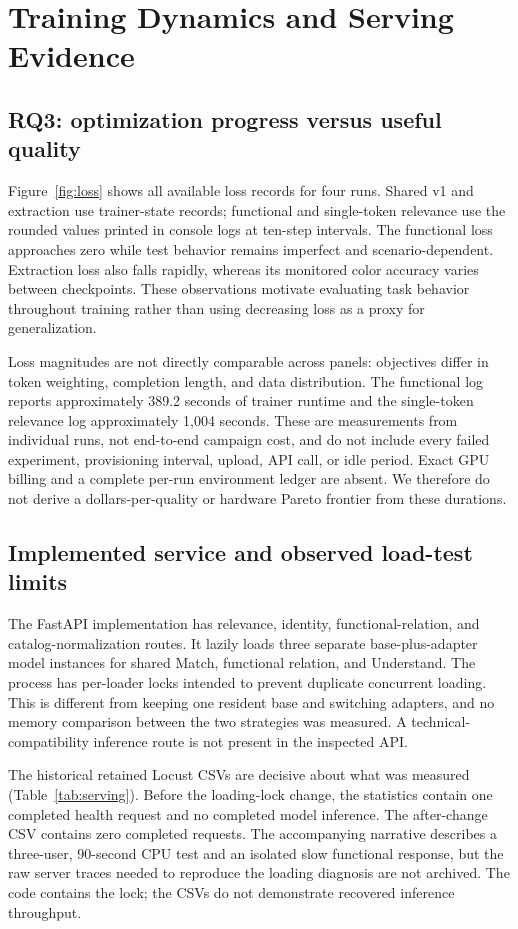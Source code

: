 \section{Training Dynamics and Serving Evidence}
\label{sec:systems}
\subsection{RQ3: optimization progress versus useful quality}
Figure~\ref{fig:loss} shows all available loss records for four runs. Shared v1 and extraction use trainer-state records; functional and single-token relevance use the rounded values printed in console logs at ten-step intervals. The functional loss approaches zero while test behavior remains imperfect and scenario-dependent. Extraction loss also falls rapidly, whereas its monitored color accuracy varies between checkpoints. These observations motivate evaluating task behavior throughout training rather than using decreasing loss as a proxy for generalization.



Loss magnitudes are not directly comparable across panels: objectives differ in token weighting, completion length, and data distribution. The functional log reports approximately 389.2 seconds of trainer runtime and the single-token relevance log approximately 1,004 seconds. These are measurements from individual runs, not end-to-end campaign cost, and do not include every failed experiment, provisioning interval, upload, API call, or idle period. Exact GPU billing and a complete per-run environment ledger are absent. We therefore do not derive a dollars-per-quality or hardware Pareto frontier from these durations.

\subsection{Implemented service and observed load-test limits}
The FastAPI implementation has relevance, identity, functional-relation, and catalog-normalization routes. It lazily loads three separate base-plus-adapter model instances for shared Match, functional relation, and Understand. The process has per-loader locks intended to prevent duplicate concurrent loading. This is different from keeping one resident base and switching adapters, and no memory comparison between the two strategies was measured. A technical-compatibility inference route is not present in the inspected API.

The historical retained Locust CSVs are decisive about what was measured (Table~\ref{tab:serving}). Before the loading-lock change, the statistics contain one completed health request and no completed model inference. The after-change CSV contains zero completed requests. The accompanying narrative describes a three-user, 90-second CPU test and an isolated slow functional response, but the raw server traces needed to reproduce the loading diagnosis are not archived. The code contains the lock; the CSVs do not demonstrate recovered inference throughput.

